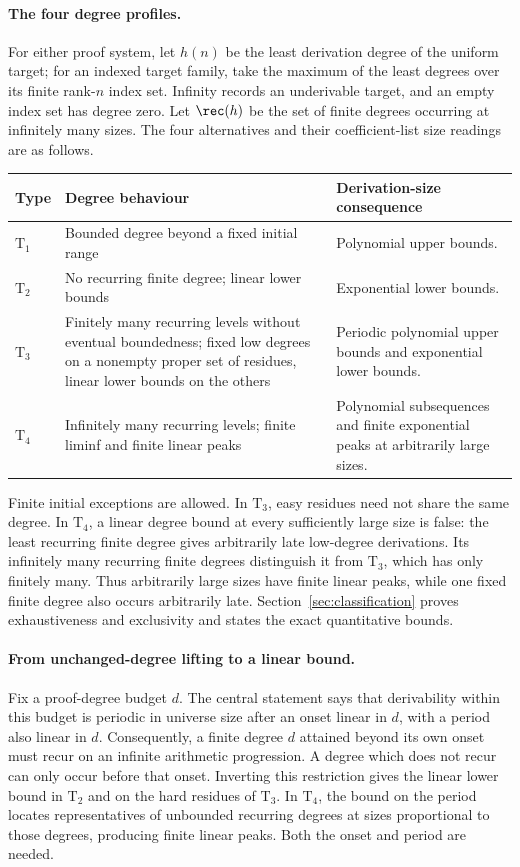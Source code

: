 \paragraph{The four degree profiles.}
For either proof system, let $h(n)$ be the least derivation degree of
the uniform target; for an indexed target family, take the maximum of
the least degrees over its finite rank-$n$ index set. Infinity records
an underivable target, and an empty index set has degree zero. Let
$\rec(h)$ be the set of finite degrees occurring at infinitely many
sizes. The four alternatives and their coefficient-list size readings
are as follows.
\begin{center}
\begin{tabular}{@{}p{}p{}p{}@{}}
\toprule
Type & Degree behaviour & Derivation-size consequence\\
\midrule
$\mathrm T_1$ & Bounded degree beyond a fixed initial range
 & Polynomial upper bounds.\\
$\mathrm T_2$ & No recurring finite degree; linear lower bounds
 & Exponential lower bounds.\\
$\mathrm T_3$ & Finitely many recurring levels without eventual boundedness;
fixed low degrees on a nonempty proper set of residues, linear lower
bounds on the others
 & Periodic polynomial upper bounds and exponential lower bounds.\\
$\mathrm T_4$ & Infinitely many recurring levels; finite liminf
and finite linear peaks
 & Polynomial subsequences and finite exponential peaks at arbitrarily
large sizes.\\
\bottomrule
\end{tabular}
\end{center}
Finite initial exceptions are allowed. In $\mathrm T_3$, easy residues
need not share the same degree. In $\mathrm T_4$, a linear degree bound
at every sufficiently large size is false: the least recurring finite
degree gives arbitrarily late low-degree derivations. Its infinitely many recurring finite degrees distinguish it from
$\mathrm T_3$, which has only finitely many. Thus arbitrarily large
sizes have finite linear peaks, while one fixed finite degree also
occurs arbitrarily late.
Section~\ref{sec:classification} proves exhaustiveness and exclusivity
and states the exact quantitative bounds.

\paragraph{From unchanged-degree lifting to a linear bound.}
Fix a proof-degree budget $d$. The central statement says that
derivability within this budget is periodic in universe size after
an onset linear in $d$, with a period also linear in $d$. Consequently,
a finite degree $d$ attained beyond its own onset must recur on an
infinite arithmetic progression. A degree which does not recur can
only occur before that onset. Inverting this restriction gives the
linear lower bound in $\mathrm T_2$ and on the hard residues of
$\mathrm T_3$. In $\mathrm T_4$, the bound on the period locates
representatives of unbounded recurring degrees at sizes proportional
to those degrees, producing finite linear peaks. Both the onset and
period are needed.

